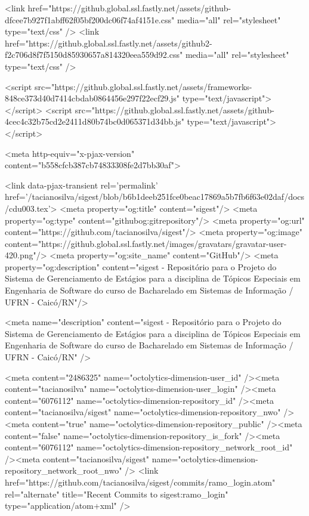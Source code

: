     <link href="https://github.global.ssl.fastly.net/assets/github-dfcee7b927f1abff62f05bf200dc06f74af4151e.css" media="all" rel="stylesheet" type="text/css" />
    <link href="https://github.global.ssl.fastly.net/assets/github2-f2c706d8f7f5150d85930657a814320eea559d92.css" media="all" rel="stylesheet" type="text/css" />
    

    

      <script src="https://github.global.ssl.fastly.net/assets/frameworks-848ce373d40d7414cbdab0864456e297f22ecf29.js" type="text/javascript"></script>
      <script src="https://github.global.ssl.fastly.net/assets/github-4cec4c32b75cd2e2411d80b74bc0d065371d34bb.js" type="text/javascript"></script>
      
      <meta http-equiv="x-pjax-version" content="b558cfcb387cb74833308fe2d7bb30af">

        <link data-pjax-transient rel='permalink' href='/tacianosilva/sigest/blob/b6b1deeb251fce0beac17869a5b7fb6f63e02daf/docs/cdu003.tex'>
  <meta property="og:title" content="sigest"/>
  <meta property="og:type" content="githubog:gitrepository"/>
  <meta property="og:url" content="https://github.com/tacianosilva/sigest"/>
  <meta property="og:image" content="https://github.global.ssl.fastly.net/images/gravatars/gravatar-user-420.png"/>
  <meta property="og:site_name" content="GitHub"/>
  <meta property="og:description" content="sigest - Repositório para o Projeto do Sistema de Gerenciamento de Estágios para a disciplina de Tópicos Especiais em Engenharia de Software do curso de Bacharelado em Sistemas de Informação / UFRN - Caicó/RN"/>

  <meta name="description" content="sigest - Repositório para o Projeto do Sistema de Gerenciamento de Estágios para a disciplina de Tópicos Especiais em Engenharia de Software do curso de Bacharelado em Sistemas de Informação / UFRN - Caicó/RN" />

  <meta content="2486325" name="octolytics-dimension-user_id" /><meta content="tacianosilva" name="octolytics-dimension-user_login" /><meta content="6076112" name="octolytics-dimension-repository_id" /><meta content="tacianosilva/sigest" name="octolytics-dimension-repository_nwo" /><meta content="true" name="octolytics-dimension-repository_public" /><meta content="false" name="octolytics-dimension-repository_is_fork" /><meta content="6076112" name="octolytics-dimension-repository_network_root_id" /><meta content="tacianosilva/sigest" name="octolytics-dimension-repository_network_root_nwo" />
  <link href="https://github.com/tacianosilva/sigest/commits/ramo_login.atom" rel="alternate" title="Recent Commits to sigest:ramo_login" type="application/atom+xml" />

